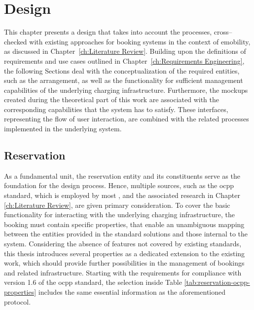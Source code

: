 
\chapter{Design}
\label{ch:Design}

This chapter presents a design that takes into account the processes, cross--checked with existing approaches for booking systems in the context of \acrshort{emobility}, as discussed in Chapter~\ref{ch:Literature Review}.
Building upon the definitions of requirements and use cases outlined in Chapter~\ref{ch:Requirements Engineering}, the following Sections deal with the conceptualization of the required entities, such as the arrangement, as well as the functionality for sufficient management capabilities of the underlying charging infrastructure.
Furthermore, the mockups created during the theoretical part of this work are associated with the corresponding capabilities that the system has to satisfy. These interfaces, representing the flow of user interaction, are combined with the related processes implemented in the underlying system.

\section{Reservation}
\label{ch:Design:sec:Reservation}

As a fundamental unit, the reservation entity and its constituents serve as the foundation for the design process.
Hence, multiple sources, such as the \acrshort{ocpp} standard, which is employed by most , and the associated research in Chapter \ref{ch:Literature Review}, are given primary consideration.
To cover the basic functionality for interacting with the underlying charging infrastructure, the booking must contain specific properties, that enable an unambiguous mapping between the entities provided in the standard solutions and those internal to the system.
Considering the absence of features not covered by existing standards, this thesis introduces several properties as a dedicated extension to the existing work, which should provide further possibilities in the management of bookings and related infrastructure.
Starting with the requirements for compliance with version 1.6 of the \acrshort{ocpp} standard, the selection inside Table \ref{tab:reservation-ocpp-properties} includes the same essential information as the aforementioned protocol.

